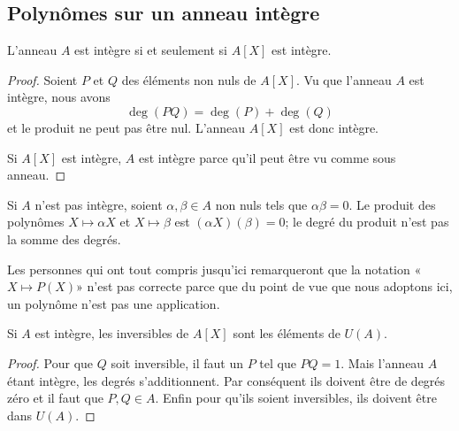\subsection{Polynômes sur un anneau intègre}

\begin{theorem}     \label{ThoBUEDrJ}
    L'anneau \( A\) est intègre si et seulement si \( A[X]\) est intègre.
\end{theorem}

\begin{proof}
    Soient \( P\) et \( Q\) des éléments non nuls de \( A[X]\). Vu que l'anneau \( A\) est intègre, nous avons
    \begin{equation}
        \deg(PQ)=\deg(P)+\deg(Q)
    \end{equation}
    et le produit ne peut pas être nul. L'anneau \( A[X]\) est donc intègre.

    Si \( A[X]\) est intègre, \( A\) est intègre parce qu'il peut être vu comme sous anneau.
\end{proof}

\begin{normaltext}
    Si \( A\) n'est pas intègre, soient \( \alpha,\beta\in A\) non nuls tels que \( \alpha\beta=0\). Le produit des polynômes \( X\mapsto \alpha X\) et \( X\mapsto \beta\) est \( (\alpha X)(\beta)=0\); le degré du produit n'est pas la somme des degrés.

    Les personnes qui ont tout compris jusqu'ici remarqueront que la notation «\( X\mapsto P(X)\)» n'est pas correcte parce que du point de vue que nous adoptons ici, un polynôme n'est pas une application.
\end{normaltext}

\begin{corollary}
    Si \( A\) est intègre, les inversibles de \( A[X]\) sont les éléments de \( U(A)\).
\end{corollary}

\begin{proof}
    Pour que \( Q\) soit inversible, il faut un \( P\) tel que \( PQ=1\). Mais l'anneau \( A\) étant intègre, les degrés s'additionnent. Par conséquent ils doivent être de degrés zéro et il faut que \( P,Q\in A\). Enfin pour qu'ils soient inversibles, ils doivent être dans \( U(A)\).
\end{proof}

